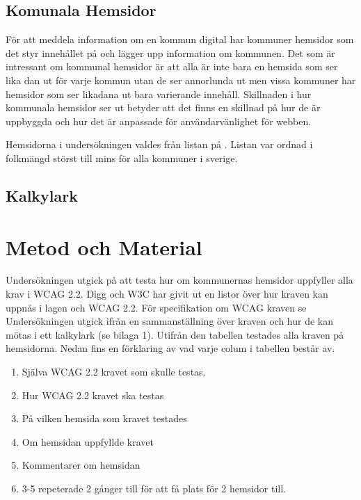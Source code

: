 \documentclass[11p]{article}
\begin{document}
    \subsection{Komunala Hemsidor}
    För att meddela information om en kommun digital har kommuner hemsidor som det styr innehållet på och lägger upp information om kommunen.
    Det som är intressant om kommunal hemsidor är att alla är inte bara en hemsida som ser lika dan ut för varje kommun utan de ser annorlunda ut men vissa kommuner har hemsidor som ser likadana ut bara varierande innehåll.
    Skillnaden i hur kommunala hemsidor ser ut betyder att det finns en skillnad på hur de är uppbyggda och hur det är anpassade för användarvänlighet för webben.
    
    Hemsidorna i undersökningen valdes från listan på \textcite{SverigesKommuner}.
    Listan var ordnad i folkmängd störst till mins för alla kommuner i sverige.

    \subsection{Kalkylark}

    
    \section{Metod och Material}

    Undersökningen utgick på att testa hur om kommunernas hemsidor uppfyller alla krav i WCAG 2.2.
    Digg och W3C har givit ut en listor över hur kraven kan uppnås i lagen och WCAG 2.2.
    För specifikation om WCAG kraven se \textcite{WCAG_2.2}
    Undersökningen utgick ifrån en sammanställning över kraven och hur de kan mötas i ett kalkylark (se bilaga 1).
    Utifrån den tabellen testades alla kraven på hemsidorna.
    Nedan fins en förklaring av vad varje colum i tabellen består av.
    \begin{enumerate}
        \item Själva WCAG 2.2 kravet som skulle testas.
        \item Hur WCAG 2.2 kravet ska testas
        \item På vilken hemsida som kravet testades
        \item Om hemsidan uppfyllde kravet
        \item Kommentarer om hemsidan
        \item 3-5 repeterade 2 gånger till för att få plats för 2 hemsidor till.
    \end{enumerate}
\end{document}
